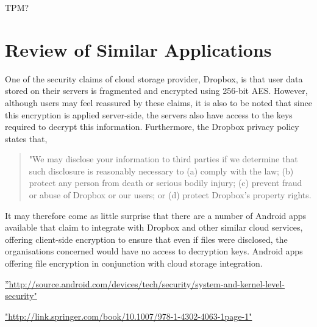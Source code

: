TPM?
\section{Review of Similar Applications}

One of the security claims of cloud storage provider, Dropbox, is that user data stored on their servers is  fragmented and encrypted using 256-bit AES.  However, although users may feel reassured by these claims, it is also to be noted that since this encryption is applied server-side, the servers also have access to the keys required to decrypt this information.  Furthermore, the   Dropbox privacy policy states that,  
\begin{quotation}
"We may disclose your information to third parties if we determine that such disclosure is reasonably necessary to (a) comply with the law; (b) protect any person from death or serious bodily injury; (c) prevent fraud or abuse of Dropbox or our users; or (d) protect Dropbox's property rights. 
\end{quotation} 

It may therefore come as little surprise that there are a number of Android apps available that claim to integrate with Dropbox and other similar cloud services, offering  client-side encryption to ensure that even if files were disclosed, the organisations concerned would have no access to decryption keys.
Android apps offering file encryption in conjunction with cloud storage integration.  

\hyperref[label_name]{''http://source.android.com/devices/tech/security/system-and-kernel-level-security"}



\hyperref[label_name2]{"http://link.springer.com/book/10.1007/978-1-4302-4063-1page-1"}


